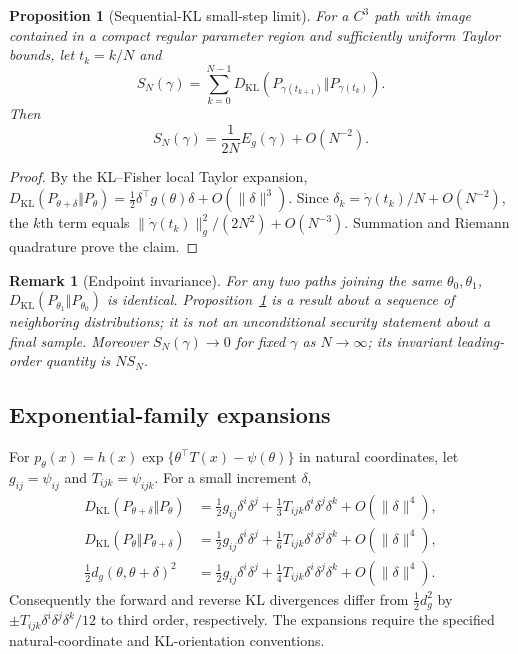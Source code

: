 \documentclass[preprint,12pt]{elsarticle}
\newtheorem{proposition}{Proposition}
\newtheorem{remark}{Remark}
\newcommand{\KL}{D_{\mathrm{KL}}}
\begin{document}
\begin{proposition}[Sequential-KL small-step limit]
\label{prop:klpath}
For a $C^3$ path with image contained in a compact regular
parameter region and sufficiently uniform Taylor bounds,
let $t_k=k/N$ and
\[
S_N(\gamma)=\sum_{k=0}^{N-1}
 \KL(P_{\gamma(t_{k+1})}\Vert P_{\gamma(t_k)}).
\]
Then
\[
 S_N(\gamma)=\frac{1}{2N}E_g(\gamma)+O(N^{-2}).
\]
\end{proposition}
\begin{proof}
By the KL--Fisher local Taylor expansion,
$\KL(P_{\theta+\delta}\Vert P_\theta)
=\frac12\delta^\top g(\theta)\delta
+O(\|\delta\|^3)$.
Since $\delta_k=\dot\gamma(t_k)/N+O(N^{-2})$,
the $k$th term equals
$\|\dot\gamma(t_k)\|_g^2/(2N^2)+O(N^{-3})$.
Summation and Riemann quadrature prove the claim.
\end{proof}


\begin{remark}[Endpoint invariance]
\label{rem:endpoint}
For any two paths joining the same $\theta_0,\theta_1$,
$\KL(P_{\theta_1}\Vert P_{\theta_0})$ is identical.
Proposition~\ref{prop:klpath} is a result about a
\emph{sequence of neighboring distributions}; it is not an
unconditional security statement about a final sample.
Moreover $S_N(\gamma)\to0$ for fixed $\gamma$ as $N\to\infty$;
its invariant leading-order quantity is $NS_N$.
\end{remark}


\subsection{Exponential-family expansions}
For
$p_\theta(x)=h(x)\exp\{\theta^\top T(x)-\psi(\theta)\}$
in natural coordinates, let $g_{ij}=\psi_{ij}$ and
$T_{ijk}=\psi_{ijk}$.
For a small increment $\delta$,
\begin{align}
\KL(P_{\theta+\delta}\Vert P_\theta)
 &=\frac12g_{ij}\delta^i\delta^j+
   \frac13T_{ijk}\delta^i\delta^j\delta^k+
   O(\|\delta\|^4),\\
\KL(P_\theta\Vert P_{\theta+\delta})
 &=\frac12g_{ij}\delta^i\delta^j+
   \frac16T_{ijk}\delta^i\delta^j\delta^k+
   O(\|\delta\|^4),\\
\frac12d_g(\theta,\theta+\delta)^2
 &=\frac12g_{ij}\delta^i\delta^j+
   \frac14T_{ijk}\delta^i\delta^j\delta^k+
   O(\|\delta\|^4).
\end{align}
Consequently the forward and reverse KL divergences differ
from $\frac12d_g^2$ by $\pm T_{ijk}\delta^i\delta^j\delta^k/12$
to third order, respectively. The expansions require the
specified natural-coordinate and KL-orientation conventions.
\end{document}
